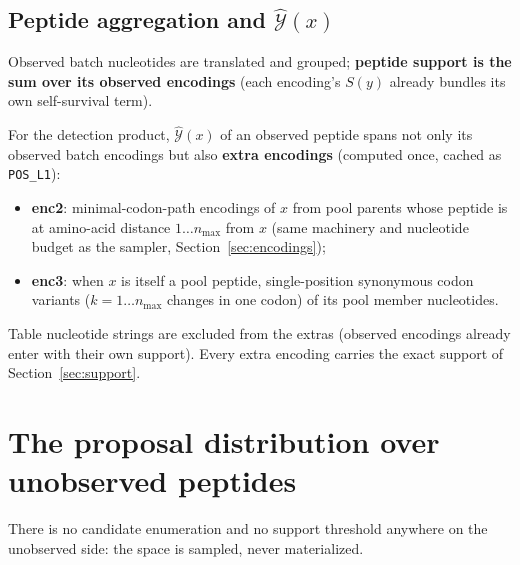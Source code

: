 \documentclass[11pt]{article}
\begin{document}
\subsection{Peptide aggregation and $\hat{\mathcal{Y}}(x)$}\label{sec:yhat}

Observed batch nucleotides are translated and grouped; \textbf{peptide
support is the sum over its observed encodings} (each encoding's $S(y)$
already bundles its own self-survival term).

For the detection product, $\hat{\mathcal{Y}}(x)$ of an observed peptide
spans not only its observed batch encodings but also \textbf{extra
encodings} (computed once, cached as \texttt{POS\_L1}):
\begin{itemize}
\item \textbf{enc2}: minimal-codon-path encodings of $x$ from pool
parents whose peptide is at amino-acid distance $1 \dots n_{\max}$ from
$x$ (same machinery and nucleotide budget as the sampler,
Section~\ref{sec:encodings});
\item \textbf{enc3}: when $x$ is itself a pool peptide, single-position
synonymous codon variants ($k = 1 \dots n_{\max}$ changes in one codon)
of its pool member nucleotides.
\end{itemize}
Table nucleotide strings are excluded from the extras (observed encodings
already enter with their own support). Every extra encoding carries the
exact support of Section~\ref{sec:support}.

\section{The proposal distribution over unobserved peptides}\label{sec:proposal}

There is no candidate enumeration and no support threshold anywhere on
the unobserved side: the space is sampled, never materialized.
\end{document}
